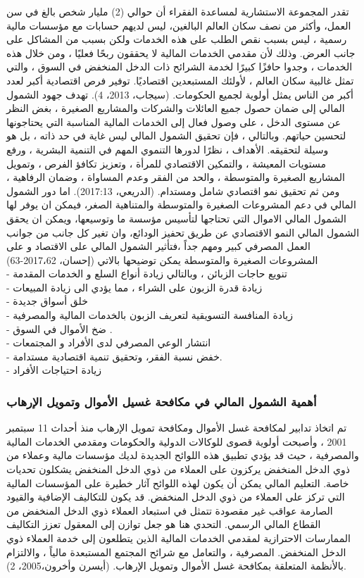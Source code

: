 \documentclass[10pt,a4paper]{report}
\begin{document}
\begin{doublespacing}
تقدر المجموعة الاستشارية لمساعدة الفقراء أن حوالي (2) مليار شخص بالغ في سن العمل، وأكثر من نصف سكان العالم البالغين، ليس لديهم حسابات مع مؤسسات مالية رسمية ، ليس بسبب نقص الطلب على هذه الخدمات ولكن بسبب من المشاكل على جانب العرض. وذلك لأن مقدمي الخدمات المالية لا يحققون ربحًا فعليًا ، ومن خلال هذه الخدمات ، وجدوا حافزًا كبيرًا لخدمة الشرائح ذات الدخل المنخفض في السوق ، والتي تمثل غالبية سكان العالم ، لأولئك المستبعدين اقتصاديًا. توفير فرص اقتصادية أكبر لعدد أكبر من الناس يمثل أولوية لجميع الحكومات. (سيجاب، 2013، 4). تهدف جهود الشمول المالي إلى ضمان حصول جميع العائلات والشركات والمشاريع الصغيرة ، بغض النظر عن مستوى الدخل ، على وصول فعال إلى الخدمات المالية المناسبة التي يحتاجونها لتحسين حياتهم. وبالتالي ، فإن تحقيق الشمول المالي ليس غاية في حد ذاته ، بل هو وسيلة لتحقيقه. الأهداف ، نظرًا لدورها التنموي المهم في التنمية البشرية ، ورفع مستويات المعيشة ، والتمكين الاقتصادي للمرأة ، وتعزيز تكافؤ الفرص ، وتمويل المشاريع الصغيرة والمتوسطة ، والحد من الفقر وعدم المساواة ، وضمان الرفاهية ، ومن ثم تحقيق نمو اقتصادي شامل ومستدام. (الدريعي، 2017:13).
اما دور الشمول المالي في دعم المشروعات الصغيرة والمتوسطة والمتناهية الصغر، فيمكن ان يوفر لها الشمول المالي الاموال التي تحتاجها لتأسيس مؤسسة ما وتوسيعها، ويمكن ان يحقق الشمول المالي النمو الاقتصادي عن طريق تحفيز الودائع، وان تغير كل جانب من جوانب العمل المصرفي كبير ومهم جداً ،فتأثير الشمول المالي على الاقتصاد و على المشروعات الصغيرة والمتوسطة يمكن توضيحها بالاتي (إحسان، 2017،62-63)\\ 
- تنويع حاجات الزبائن ، وبالتالي زيادة أنواع السلع و الخدمات المقدمة \\
-  زيادة قدرة الزبون على الشراء ، مما يؤدي الى زيادة المبيعات  \\
- خلق أسواق جديدة  \\
- زيادة المنافسة التسويقية لتعريف الزبون بالخدمات المالية والمصرفية \\ 
- ضخ الأموال في السوق . \\
- انتشار الوعي المصرفي لدى الأفراد و المجتمعات  \\
- خفض نسبة الفقر، وتحقيق تنمية اقتصادية مستدامة. \\
- زيادة احتياجات الأفراد \\
\subsubsection{أهمية الشمول المالي في مكافحة غسيل الأموال وتمويل الإرهاب}
تم اتخاذ تدابير لمكافحة غسل الأموال ومكافحة تمويل الإرهاب منذ أحداث 11 سبتمبر 2001 ، وأصبحت أولوية قصوى للوكالات الدولية والحكومات ومقدمي الخدمات المالية والمصرفية ، حيث قد يؤدي تطبيق هذه اللوائح الجديدة لديك مؤسسات مالية وعملاء من ذوي الدخل المنخفض يركزون على العملاء من ذوي الدخل المنخفض يشكلون تحديات خاصة. التعليم المالي يمكن أن يكون لهذه اللوائح آثار خطيرة على المؤسسات المالية التي تركز على العملاء من ذوي الدخل المنخفض. قد يكون للتكاليف الإضافية والقيود الصارمة عواقب غير مقصودة تتمثل في استبعاد العملاء ذوي الدخل المنخفض من القطاع المالي الرسمي. التحدي هنا هو جعل توازن إلى المعقول تعزز التكاليف الممارسات الاحترازية لمقدمي الخدمات المالية الذين يتطلعون إلى خدمة العملاء ذوي الدخل المنخفض. المصرفية ، والتعامل مع شرائح المجتمع المستبعدة مالياً ، والالتزام بالأنظمة المتعلقة بمكافحة غسل الأموال وتمويل الإرهاب.
(أيسرن وأخرون،2005، 2).    


\end{doublespacing}
\end{document}
